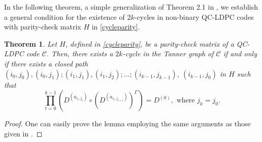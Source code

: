 \documentclass[conference]{IEEEtran}
\newtheorem{theorem}{Theorem}
\begin{document}
In the following theorem, a simple generalization of Theorem 2.1 in \cite{fossorier2004quasicyclic}, we establish a general condition for the existence of 
$2k$-cycles in non-binary QC-LDPC codes with parity-check matrix $H$ in \eqref{cycleparity}.
\begin{theorem}\label{2k-cycletheorem}
Let $H$, defined in \eqref{cycleparity}, be a parity-check matrix of a QC-LDPC code $\mathcal{C}$. Then, there exists a $2k$-cycle in the Tanner graph of $\mathcal{C}$ if and only if there exists a closed path $(i_0, j_0), (i_0, j_1); (i_1, j_1), (i_1, j_2); \ldots ;(i_{k-1}, j_{k-1})$, $ (i_{k-1}, j_0)$ in $H$ such that
\begin{equation}\label{cyclcondition.1}
    \prod_{t=0}^{k-1} \left(D^{(a_{i_{t},j_{t}})}\circ (D^{(a_{i_{t},j_{t+1}})})^{\Gamma}\right)=D^{(0)}, \text{ where } j_{k}=j_{0}.
\end{equation}
\end{theorem}
\begin{proof}
    One can easily prove the lemma employing the same arguments as those given in \cite[Theorem 1]{kumar2026entanglement}.
\end{proof}
\end{document}
